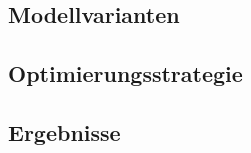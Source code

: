 \subsection{Modellvarianten}

\subsection{Optimierungsstrategie}


\subsection{Ergebnisse}
% 
% 
% 
% 
% 
% 
% 
% 
% 
% 
% 
% 